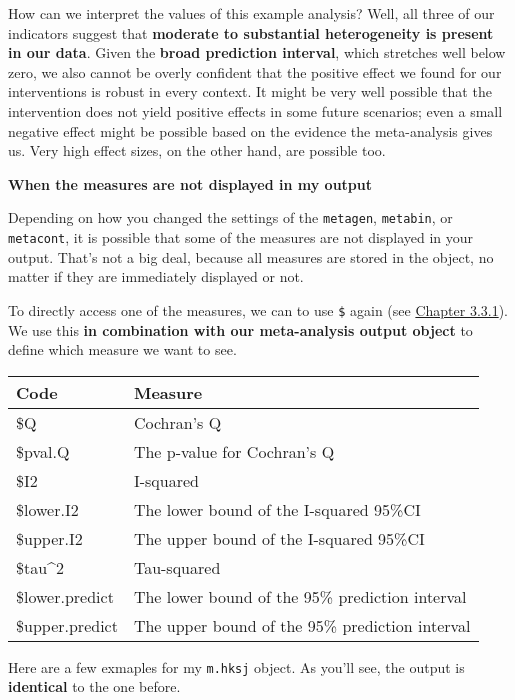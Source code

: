 \documentclass[]{book}
\newenvironment{Shaded}{\begin{snugshade}}{\end{snugshade}}
\newcommand{\OperatorTok}[1]{\textcolor[rgb]{0.81,0.36,0.00}{\textbf{#1}}}
\newcommand{\NormalTok}[1]{#1}
\theoremstyle{definition}
\theoremstyle{definition}
\theoremstyle{definition}
\theoremstyle{remark}
\begin{document}
How can we interpret the values of this example analysis? Well, all
three of our indicators suggest that \textbf{moderate to substantial
heterogeneity is present in our data}. Given the \textbf{broad
prediction interval}, which stretches well below zero, we also cannot be
overly confident that the positive effect we found for our interventions
is robust in every context. It might be very well possible that the
intervention does not yield positive effects in some future scenarios;
even a small negative effect might be possible based on the evidence the
meta-analysis gives us. Very high effect sizes, on the other hand, are
possible too.

\textbf{When the measures are not displayed in my output}

Depending on how you changed the settings of the \texttt{metagen},
\texttt{metabin}, or \texttt{metacont}, it is possible that some of the
measures are not displayed in your output. That's not a big deal,
because all measures are stored in the object, no matter if they are
immediately displayed or not.

To directly access one of the measures, we can to use \texttt{\$} again
(see \protect\hyperlink{convertfactors}{Chapter 3.3.1}). We use this
\textbf{in combination with our meta-analysis output object} to define
which measure we want to see.

\begin{tabular}{l|l}
\hline
Code & Measure\\
\hline
\$Q & Cochran's Q\\
\hline
\$pval.Q & The p-value for Cochran's Q\\
\hline
\$I2 & I-squared\\
\hline
\$lower.I2 & The lower bound of the I-squared 95\%CI\\
\hline
\$upper.I2 & The upper bound of the I-squared 95\%CI\\
\hline
\$tau\textasciicircum{}2 & Tau-squared\\
\hline
\$lower.predict & The lower bound of the 95\% prediction interval\\
\hline
\$upper.predict & The upper bound of the 95\% prediction interval\\
\hline
\end{tabular}

Here are a few exmaples for my \texttt{m.hksj} object. As you'll see,
the output is \textbf{identical} to the one before.

\begin{Shaded}
\end{Shaded}
\end{document}
